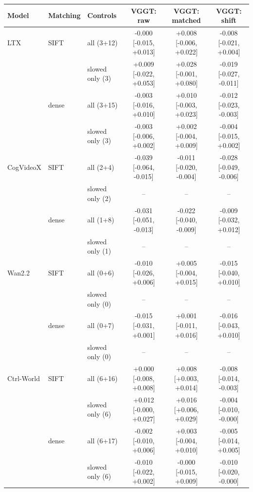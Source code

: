 \begin{tabular}{lllccc}
\toprule
Model & Matching & Controls & VGGT: raw & VGGT: matched & VGGT: shift \\
\midrule
LTX & SIFT & all (3+12) & -0.000 [-0.015, +0.013] & +0.008 [-0.006, +0.022] & -0.008 [-0.021, +0.004] \\
 &  & slowed only (3) & +0.009 [-0.022, +0.053] & +0.028 [-0.001, +0.080] & -0.019 [-0.027, -0.011] \\
 & dense & all (3+15) & -0.003 [-0.016, +0.010] & +0.010 [-0.003, +0.023] & -0.012 [-0.023, -0.003] \\
 &  & slowed only (3) & -0.003 [-0.006, +0.002] & +0.002 [-0.004, +0.009] & -0.004 [-0.015, +0.002] \\
CogVideoX & SIFT & all (2+4) & -0.039 [-0.064, -0.015] & -0.011 [-0.020, -0.004] & -0.028 [-0.049, -0.006] \\
 &  & slowed only (2) & -- & -- & -- \\
 & dense & all (1+8) & -0.031 [-0.051, -0.013] & -0.022 [-0.040, -0.009] & -0.009 [-0.032, +0.012] \\
 &  & slowed only (1) & -- & -- & -- \\
Wan2.2 & SIFT & all (0+6) & -0.010 [-0.026, +0.006] & +0.005 [-0.004, +0.015] & -0.015 [-0.040, +0.010] \\
 &  & slowed only (0) & -- & -- & -- \\
 & dense & all (0+7) & -0.015 [-0.031, +0.001] & +0.001 [-0.011, +0.016] & -0.016 [-0.043, +0.010] \\
 &  & slowed only (0) & -- & -- & -- \\
Ctrl-World & SIFT & all (6+16) & +0.000 [-0.008, +0.008] & +0.008 [+0.003, +0.014] & -0.008 [-0.014, -0.003] \\
 &  & slowed only (6) & +0.012 [-0.000, +0.027] & +0.016 [+0.006, +0.029] & -0.004 [-0.010, -0.000] \\
 & dense & all (6+17) & -0.002 [-0.010, +0.006] & +0.003 [-0.004, +0.010] & -0.005 [-0.014, +0.005] \\
 &  & slowed only (6) & -0.010 [-0.022, +0.002] & -0.000 [-0.015, +0.009] & -0.010 [-0.020, -0.000] \\
\bottomrule
\end{tabular}